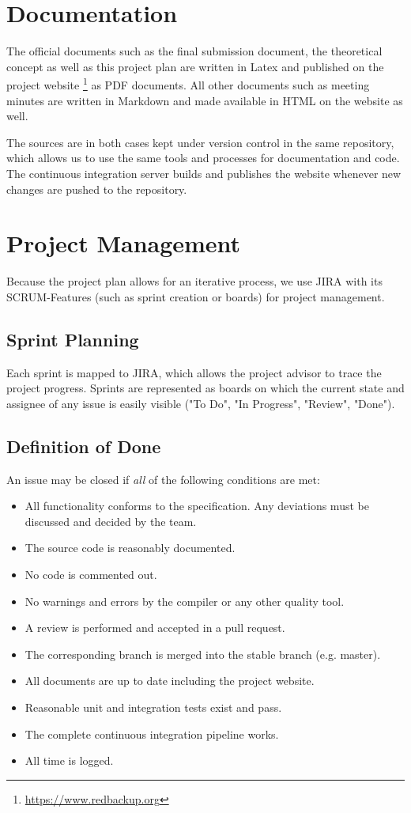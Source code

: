 \section{Documentation}
The official documents such as the final submission document, the theoretical concept as well as this project plan are written in Latex and published on the project website \footnote{\url{https://www.redbackup.org}} as PDF documents. All other documents such as meeting minutes are written in Markdown and made available in HTML on the website as well.

The sources are in both cases kept under version control in the same repository, which allows us to use the same tools and processes for documentation and code. The continuous integration server builds and publishes the website whenever new changes are pushed to the repository.

\section{Project Management}
Because the project plan allows for an iterative process, we use JIRA with its SCRUM-Features (such as sprint creation or boards) for project management.

\subsection{Sprint Planning}
Each sprint is mapped to JIRA, which allows the project advisor to trace the project progress. Sprints are represented as boards on which the current state and assignee of any issue is easily visible ("To Do", "In Progress", "Review", "Done").


\subsection{Definition of Done}
An issue may be closed if \emph{all} of the following conditions are met:

\begin{itemize}
	\item All functionality conforms to the specification. Any deviations must be discussed and decided by the team.
	\item The source code is reasonably documented.
	\item No code is commented out.
	\item No warnings and errors by the compiler or any other quality tool.
	\item A review is performed and accepted in a pull request.
	\item The corresponding branch is merged into the stable branch (e.g. master).
	\item All documents are up to date including the project website.
	\item Reasonable unit and integration tests exist and pass.
	\item The complete continuous integration pipeline works.
	\item All time is logged.
\end{itemize}

